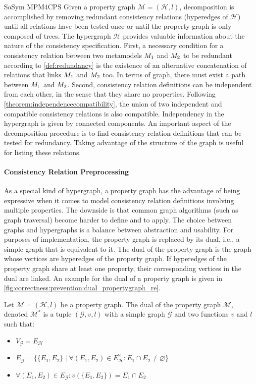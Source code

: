 \begin{copiedFrom}{SoSym MPM4CPS}
Given a property graph $\mathcal{M} = (\mathcal{H}, l)$, decomposition is accomplished by removing redundant consistency relations (hyperedges of $\mathcal{H}$) until all relations have been tested once or until the property graph is only composed of trees.
The hypergraph $\mathcal{H}$ provides valuable information about the nature of the consistency specification. First, a necessary condition for a consistency relation between two metamodels $M_{1}$ and $M_{2}$ to be redundant according to \autoref{def:redundancy} is the existence of an alternative concatenation of relations that links $M_{1}$ and $M_{2}$ too. In terms of graph, there must exist a path between $M_{1}$ and $M_{2}$. Second, consistency relation definitions can be independent from each other, in the sense that they share no properties. Following \autoref{theorem:independencecompatibility}, the union of two independent and compatible consistency relations is also compatible. Independency in the hypergraph is given by connected components. An important aspect of the decomposition procedure is to find consistency relation definitions that can be tested for redundancy. Taking advantage of the structure of the graph is useful for listing these relations.

\paragraph{Consistency Relation Preprocessing}
As a special kind of hypergraph, a property graph has the advantage of being expressive when it comes to model consistency relation definitions involving multiple properties. The downside is that common graph algorithms (such as graph traversal) become harder to define and to apply. The choice between graphs and hypergraphs is a balance between abstraction and usability. 
For purposes of implementation, the property graph is replaced by its dual, i.e., a simple graph that is equivalent to it. The dual of the property graph is the graph whose vertices are hyperedges of the property graph. If hyperedges of the property graph share at least one property, their corresponding vertices in the dual are linked. An example for the dual of a property graph is given in \autoref{fig:correctness:prevention:dual_propertygraph_re}.

\begin{definition}
Let $\mathcal{M} = (\mathcal{H}, l)$ be a property graph. The dual of the property graph $\mathcal{M}$, denoted $\mathcal{M^{*}}$ is a tuple $(\mathcal{G}, v, l)$ with a simple graph $\mathcal{G}$ and two functions $v$ and $l$ such that:
    \begin{itemize}
        \item $V_{\mathcal{G}} = E_{\mathcal{H}}$
        \item $E_{\mathcal{G}} = \{\{E_1, E_2\} \mid \forall (E_1, E_2) \in E_{\mathcal{H}}^2 : E_1 \cap E_2 \neq \varnothing\}$
        \item $\forall (E_1, E_2) \in E_{\mathcal{G}} : v(\{E_1, E_2\}) = E_1 \cap E_2$
    \end{itemize}
\end{definition}


\end{copiedFrom}

